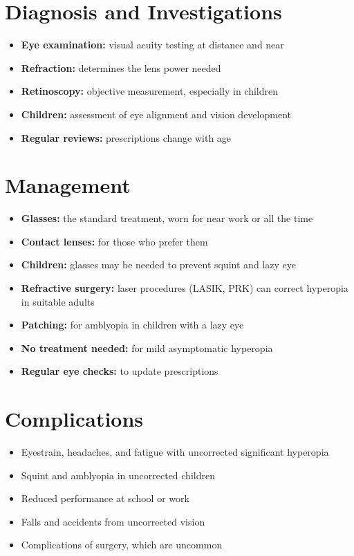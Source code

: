 \section*{Diagnosis and Investigations}
\begin{itemize}
    \item \textbf{Eye examination:} visual acuity testing at distance and near
    \item \textbf{Refraction:} determines the lens power needed
    \item \textbf{Retinoscopy:} objective measurement, especially in children
    \item \textbf{Children:} assessment of eye alignment and vision development
    \item \textbf{Regular reviews:} prescriptions change with age
\end{itemize}

\section*{Management}
\begin{itemize}
    \item \textbf{Glasses:} the standard treatment, worn for near work or all the time
    \item \textbf{Contact lenses:} for those who prefer them
    \item \textbf{Children:} glasses may be needed to prevent squint and lazy eye
    \item \textbf{Refractive surgery:} laser procedures (LASIK, PRK) can correct hyperopia in suitable adults
    \item \textbf{Patching:} for amblyopia in children with a lazy eye
    \item \textbf{No treatment needed:} for mild asymptomatic hyperopia
    \item \textbf{Regular eye checks:} to update prescriptions
\end{itemize}

\section*{Complications}
\begin{itemize}
    \item Eyestrain, headaches, and fatigue with uncorrected significant hyperopia
    \item Squint and amblyopia in uncorrected children
    \item Reduced performance at school or work
    \item Falls and accidents from uncorrected vision
    \item Complications of surgery, which are uncommon
\end{itemize}

